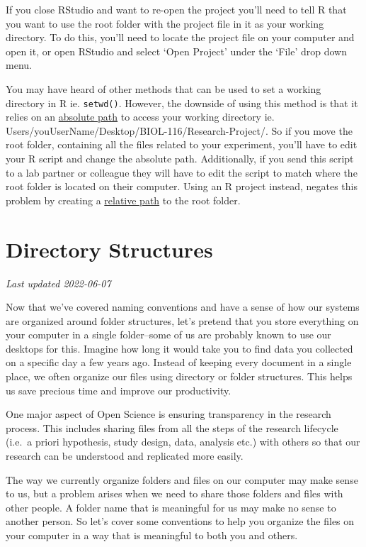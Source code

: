\documentclass[
]{book}
\begin{document}
If you close RStudio and want to re-open the project you'll need to tell R that you want to use the root folder with the project file in it as your working directory. To do this, you'll need to locate the project file on your computer and open it, or open RStudio and select `Open Project' under the `File' drop down menu.

You may have heard of other methods that can be used to set a working directory in R ie. \texttt{setwd()}. However, the downside of using this method is that it relies on an \href{https://ubco-biology.github.io/Procedures-and-Guidelines/relative-and-absolute-paths}{absolute path} to access your working directory ie. Users/youUserName/Desktop/BIOL-116/Research-Project/. So if you move the root folder, containing all the files related to your experiment, you'll have to edit your R script and change the absolute path. Additionally, if you send this script to a lab partner or colleague they will have to edit the script to match where the root folder is located on their computer. Using an R project instead, negates this problem by creating a \href{https://ubco-biology.github.io/Procedures-and-Guidelines/relative-and-absolute-paths}{relative path} to the root folder.

\hypertarget{directory-structures}{%
\chapter{Directory Structures}\label{directory-structures}}

\emph{Last updated 2022-06-07}

Now that we've covered naming conventions and have a sense of how our systems are organized around folder structures, let's pretend that you store everything on your computer in a single folder--some of us are probably known to use our desktops for this. Imagine how long it would take you to find data you collected on a specific day a few years ago. Instead of keeping every document in a single place, we often organize our files using directory or folder structures. This helps us save precious time and improve our productivity.

One major aspect of Open Science is ensuring transparency in the research process. This includes sharing files from all the steps of the research lifecycle (i.e.~a priori hypothesis, study design, data, analysis etc.) with others so that our research can be understood and replicated more easily.

The way we currently organize folders and files on our computer may make sense to us, but a problem arises when we need to share those folders and files with other people. A folder name that is meaningful for us may make no sense to another person. So let's cover some conventions to help you organize the files on your computer in a way that is meaningful to both you and others.
\end{document}
